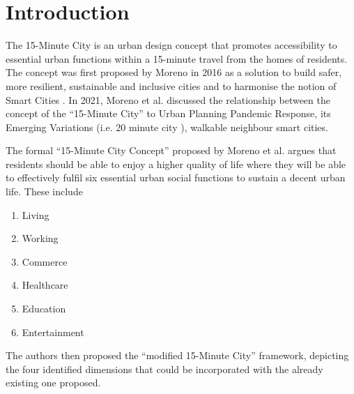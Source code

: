 \chapter{Introduction} \label{intro}

The 15-Minute City is an urban design concept that promotes accessibility to essential urban functions within a 15-minute travel from the homes of residents. The concept was first proposed by Moreno in 2016 as a solution to build safer, more resilient, sustainable and inclusive cities and to harmonise the notion of Smart Cities \cite{moreno_introducing_2021}. In 2021, Moreno et al. discussed the relationship between the concept of the “15-Minute City” to Urban Planning Pandemic Response, its Emerging Variations (i.e. 20 minute city \cite{capasso_da_silva_accessibility_2019}), walkable neighbour \cite{weng_15-minute_2019} smart cities.

The formal “15-Minute City Concept” proposed by Moreno et al. argues that residents should be able to enjoy a higher quality of life where they will be able to effectively fulfil six essential urban social functions to sustain a decent urban life. These include

\begin{multicols}{2}
    \begin{enumerate}
        \item Living
        \item Working
        \item Commerce
        \item Healthcare
        \item Education
        \item Entertainment
    \end{enumerate}
\end{multicols}

The authors then proposed the “modified 15-Minute City” framework, depicting the four identified dimensions that could be incorporated with the already existing one proposed.

